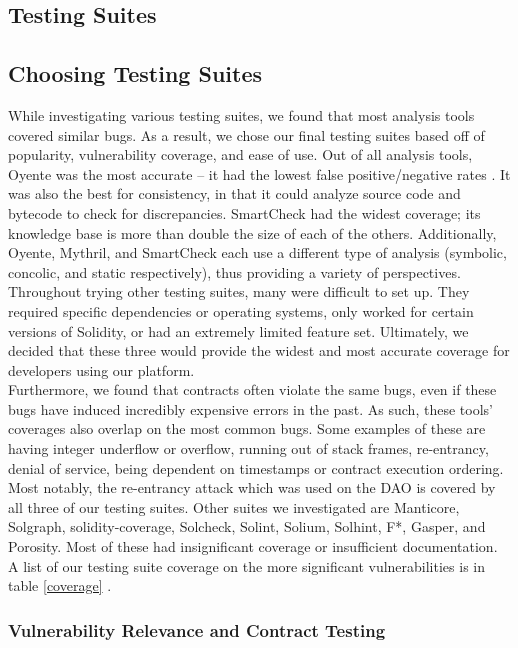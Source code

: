 \subsection{Testing Suites}
\subsection*{Choosing Testing Suites}
While investigating various testing suites, we found that most analysis tools covered similar bugs. As a result, we chose our final testing suites based off of popularity, vulnerability coverage, and ease of use. Out of all analysis tools, Oyente was the most accurate -- it had the lowest false positive/negative rates \cite{ntnutools}. It was also the best for consistency, in that it could analyze source code and bytecode to check for discrepancies. SmartCheck had the widest coverage; its knowledge base is more than double the size of each of the others. Additionally, Oyente, Mythril, and SmartCheck each use a different type of analysis (symbolic, concolic, and static respectively), thus providing a variety of perspectives. Throughout trying other testing suites, many were difficult to set up. They required specific dependencies or operating systems, only worked for certain versions of Solidity, or had an extremely limited feature set. Ultimately, we decided that these three would provide the widest and most accurate coverage for developers using our platform. \\

Furthermore, we found that contracts often violate the same bugs, even if these bugs have induced incredibly expensive errors in the past. As such, these tools' coverages also overlap on the most common bugs. Some examples of these are having integer underflow or overflow, running out of stack frames, re-entrancy, denial of service, being dependent on timestamps or contract execution ordering. Most notably, the re-entrancy attack which was used on the DAO is covered by all three of our testing suites. Other suites we investigated are Manticore, Solgraph, solidity-coverage, Solcheck, Solint, Solium, Solhint, F*, Gasper, and Porosity. Most of these had insignificant coverage or insufficient documentation. A list of our testing suite coverage on the more significant vulnerabilities is in table \ref{coverage} \cite{mythrilvuln, scvuln}. 

\subsubsection{Vulnerability Relevance and Contract Testing}

